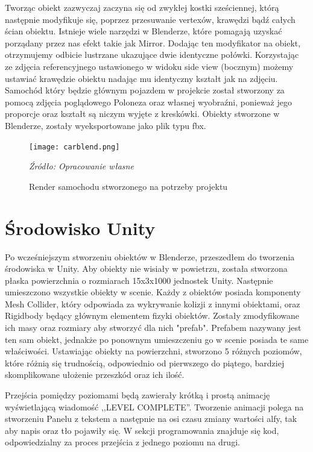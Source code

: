 \indent Tworząc obiekt zazwyczaj zaczyna się od zwykłej kostki sześciennej, którą następnie modyfikuje się, poprzez przesuwanie vertexów, krawędzi bądź całych ścian obiektu. Istnieje wiele narzędzi w Blenderze, które pomagają uzyskać porządany przez nas efekt takie jak Mirror. Dodając ten modyfikator na obiekt, otrzymujemy odbicie lustrzane ukazujące dwie identyczne połówki. Korzystając ze zdjęcia referencyjnego ustawionego w widoku side view (bocznym) możemy ustawiać krawędzie obiektu nadając mu identyczny kształt jak na zdjęciu. Samochód który będzie głównym pojazdem w projekcie został stworzony za pomocą zdjęcia poglądowego Poloneza oraz własnej wyobraźni, ponieważ jego proporcje oraz kształt są niczym wyjęte z kreskówki. Obiekty stworzone w Blenderze, zostały wyeksportowane jako plik typu fbx.

\begin{figure}[!h]
\centering
  \texttt{[image: carblend.png]}
  \caption{Render samochodu stworzonego na potrzeby projektu}\label{rys_2}
  \begin{minipage}[t]{0.5\linewidth}
    \emph{Źródło: Opracowanie własne}
  \end{minipage}
\end{figure}


\section{Środowisko Unity}
\indent Po wcześniejszym stworzeniu obiektów w Blenderze, przeszedłem do tworzenia środowiska w Unity. Aby obiekty nie wisiały w powietrzu, została stworzona płaska powierzchnia o rozmiarach 15x3x1000 jednostek Unity. Następnie umieszczono wszystkie obiekty w scenie. Każdy z obiektów posiada komponenty Mesh Collider, który odpowiada za wykrywanie kolizji z innymi obiektami, oraz Rigidbody będący głównym elementem fizyki obiektów.  Zostały zmodyfikowane ich masy oraz rozmiary aby stworzyć dla nich "prefab". Prefabem nazywany jest ten sam obiekt, jednakże po ponownym umieszczeniu go w scenie posiada te same właściwości. Ustawiając obiekty na powierzchni, stworzono 5 różnych poziomów, które różnią się trudnością, odpowiednio od pierwszego do piątego, bardziej skomplikowane ułożenie przeszkód oraz ich ilość. 

\indent Przejścia pomiędzy poziomami będą zawierały krótką i prostą animację wyświetlającą wiadomość ,,LEVEL COMPLETE''. Tworzenie animacji polega na stworzeniu Panelu z tekstem a następnie na osi czasu zmiany wartości alfy, tak aby napis oraz tło pojawiły się. W sekcji programowania znajduje się kod, odpowiedzialny za proces przejścia z jednego poziomu na drugi. 


